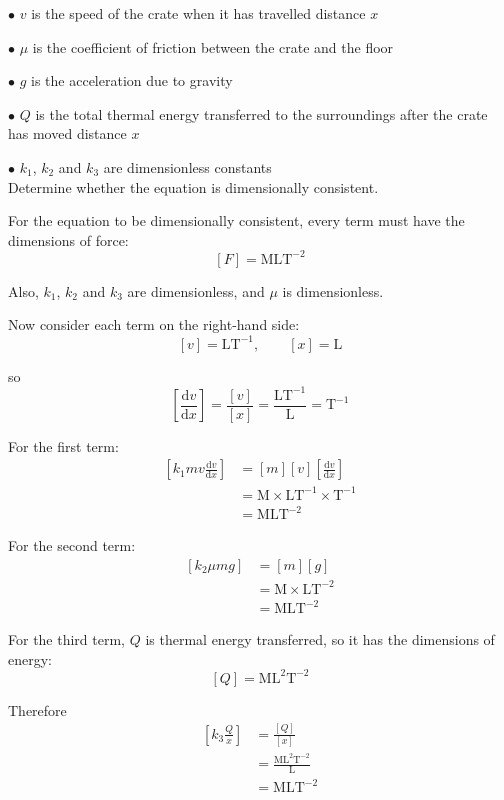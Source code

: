 \documentclass[leqno]{article}
\begin{document}
\begin{enumerate}[
  label=\textbf{\arabic*.},
  leftmargin=*,
  topsep=0pt,
  partopsep=0pt,
  parsep=0pt
]
$\bullet$ $v$ is the speed of the crate when it has travelled distance $x$

$\bullet$ $\mu$ is the coefficient of friction between the crate and the floor

$\bullet$ $g$ is the acceleration due to gravity

$\bullet$ $Q$ is the total thermal energy transferred to the surroundings after the crate has moved distance $x$

$\bullet$ $k_1$, $k_2$ and $k_3$ are dimensionless constants \\

Determine whether the equation is dimensionally consistent.  \\

\vspace*{10pt}

\begin{djsSolution}
For the equation to be dimensionally consistent, every term must have the dimensions of force:
\[
[F]=\mathrm{MLT^{-2}}
\]

Also, \(k_1\), \(k_2\) and \(k_3\) are dimensionless, and \(\mu\) is dimensionless.

Now consider each term on the right-hand side:
\[
[v]=\mathrm{LT^{-1}}, \qquad [x]=\mathrm{L}
\]

so
\[
\left[\frac{\mathrm{d}v}{\mathrm{d}x}\right]=\frac{[v]}{[x]}=\frac{\mathrm{LT^{-1}}}{\mathrm{L}}=\mathrm{T^{-1}}
\]

For the first term:
\begin{align*}
\left[k_1mv\frac{\mathrm{d}v}{\mathrm{d}x}\right]
&=[m][v]\left[\frac{\mathrm{d}v}{\mathrm{d}x}\right] \\
&=\mathrm{M}\times\mathrm{LT^{-1}}\times\mathrm{T^{-1}} \\
&=\mathrm{MLT^{-2}}
\end{align*}

For the second term:
\begin{align*}
\left[k_2\mu mg\right]
&=[m][g] \\
&=\mathrm{M}\times\mathrm{LT^{-2}} \\
&=\mathrm{MLT^{-2}}
\end{align*}

For the third term, \(Q\) is thermal energy transferred, so it has the dimensions of energy:
\[
[Q]=\mathrm{ML^{2}T^{-2}}
\]

Therefore
\begin{align*}
\left[k_3\frac{Q}{x}\right]
&=\frac{[Q]}{[x]} \\
&=\frac{\mathrm{ML^{2}T^{-2}}}{\mathrm{L}} \\
&=\mathrm{MLT^{-2}}
\end{align*}


\end{djsSolution}
\end{enumerate}
\end{document}
